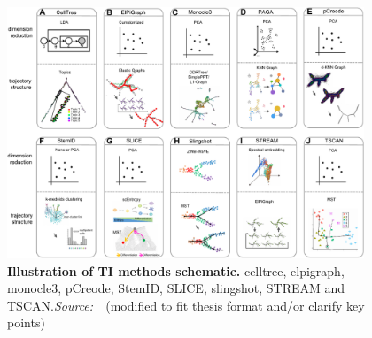 \begin{description}

\begin{figure}[h!]
  	\centering
  	\includegraphics[width=0.95\textwidth]{TI_comparison/fig}
  	\vspace{0.1cm}
  	\caption[Illustration of TI methods schematic.]{\textbf{Illustration of TI methods schematic.} celltree, elpigraph, monocle3, pCreode, StemID, SLICE, slingshot, STREAM and TSCAN.\emph{Source:~\cite{duverle2016celltree,albergante2020ElPiGraph,cao2019monocle3,herring2018pCreode,grun2016stemid,guo2017slice,street2018slingshot,chen2019stream,ji2016tscan}}~(modified to fit thesis format and/or clarify key points)
  	}
  	\label{fig:TI_comparison}
\end{figure}



\end{description}
